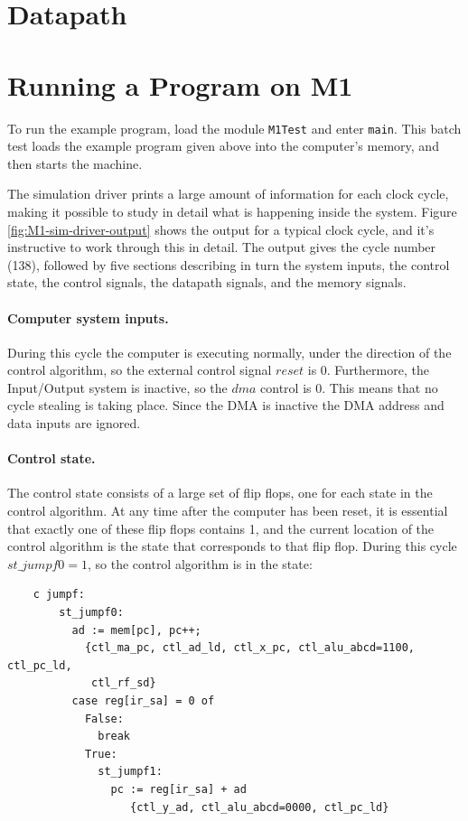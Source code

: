 \documentclass[a4paper,openany,fleqn]{book}
\begin{document}
\section{Datapath}
\label{sec:datapath}

\section{Running a Program on M1}
\label{sec:running-program-m1}

To run the example program, load the module \texttt{M1Test} and enter
\texttt{main}.  This batch test loads the example program given above
into the computer's memory, and then starts the machine.

The simulation driver prints a large amount of information for each
clock cycle, making it possible to study in detail what is happening
inside the system.  Figure \ref{fig:M1-sim-driver-output} shows the
output for a typical clock cycle, and it's instructive to work through
this in detail.  The output gives the cycle number (138), followed by
five sections describing in turn the system inputs, the control state,
the control signals, the datapath signals, and the memory signals.


\paragraph{Computer system inputs.}
\label{sec:comp-syst-inputs}
During this cycle the computer is executing normally, under the
direction of the control algorithm, so the external control signal
$\mathit{reset}$ is 0.  Furthermore, the Input/Output system is
inactive, so the $\mathit{dma}$ control is 0.  This means that no
cycle stealing is taking place.  Since the DMA is inactive the DMA
address and data inputs are ignored.

\paragraph{Control state.}
\label{sec:control-state}
The control state consists of a large set of flip flops, one for each
state in the control algorithm. At any time after the computer has
been reset, it is essential that exactly one of these flip flops
contains 1, and the current location of the control algorithm is the
state that corresponds to that flip flop.  During this cycle
$\mathit{st\_jumpf0 = 1}$, so the control algorithm is in the state:

{\footnotesize
\begin{verbatim}
    c jumpf:
        st_jumpf0:
          ad := mem[pc], pc++;
            {ctl_ma_pc, ctl_ad_ld, ctl_x_pc, ctl_alu_abcd=1100, ctl_pc_ld,
             ctl_rf_sd}
          case reg[ir_sa] = 0 of
            False:
              break
            True:
              st_jumpf1:
                pc := reg[ir_sa] + ad
                   {ctl_y_ad, ctl_alu_abcd=0000, ctl_pc_ld}
\end{verbatim}
}
\end{document}
